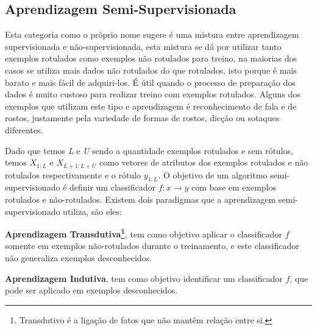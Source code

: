 \subsection{Aprendizagem Semi-Supervisionada}
\label{subsec:semi-supervised-learning}
Esta categoria como o próprio nome sugere é uma mistura entre aprendizagem supervisionada e não-supervisionada, 
esta mistura se dá por utilizar tanto exemplos rotulados como exemplos não rotulados para treino, na maiorias dos casos se utiliza 
mais dados não rotulados do que rotulados, isto porque é mais barato e mais fácil de adquiri-los. É útil quando o processo de preparação
dos dados é muito custoso para realizar treino com exemplos  rotulados.
Alguns dos exemplos que utilizam este tipo e aprendizagem é reconhecimento de fala e de rostos, justamente pela variedade
de formas de rostos, dicção ou sotaques diferentes.

Dado que temos \textit{L} e \textit{U} sendo a quantidade exemplos rotulados e sem rótulos, temos $X_{1:L}$ e $X_{L+1: L+U}$ como vetores de atributos dos exemplos
rotulados e não rotulados respectivamente e o rótulo $y_{1:L}$.  O objetivo de um algoritmo semi-supervisionado é definir 
um classificador $f : x \rightarrow y$ com base em exemplos rotulados e não-rotulados. Existem dois paradigmas que a aprendizagem
semi-supervisionado utiliza, são eles:

\begin{alineas}
	\item \textbf{Aprendizagem Transdutiva\footnote{Transdutivo é a ligação de fatos que não mantêm relação entre si.}}, tem como objetivo aplicar o classificador $f$ somente em exemplos 
	não-rotulados durante o treinamento, e este classificador não generaliza exemplos desconhecidos.\cite{Zhu03semi-supervisedlearning,Zhou04learningwith}
	\item \textbf{Aprendizagem Indutiva}, tem como objetivo identificar um classificador $f$, que pode ser aplicado em exemplos desconhecidos.
	\cite{indutive-learning} 
\end{alineas} 